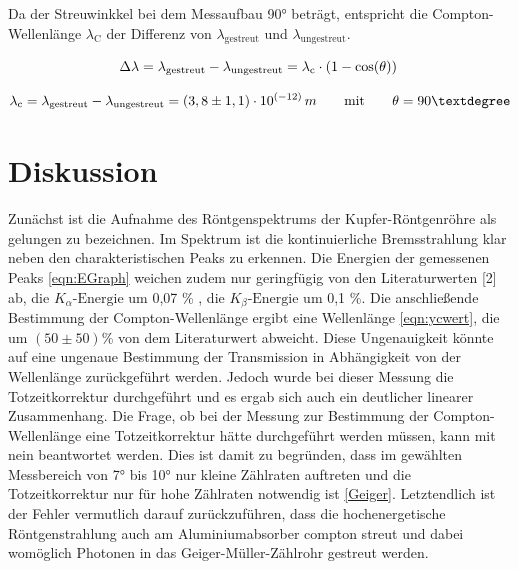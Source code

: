 \documentclass[titlepage = firstcover]{scrartcl}
\begin{document}
        \noindent
        Da der Streuwinkkel bei dem Messaufbau 90° beträgt, entspricht die Compton-Wellenlänge $\lambda_{\text{C}}$ der Differenz von $\lambda_{\text{gestreut}}$
        und $\lambda_{\text{ungestreut}}$.
        
        \begin{equation*}
            \Delta \lambda = \lambda_{\text{gestreut}} - \lambda_{\text{ungestreut}} = \lambda_{\text{c}} \cdot \left(1 -\cos (\theta)\right) \\
            \label{eqn:ycexp}
        \end{equation*}

        \begin{equation}
            \lambda_{\text{c}} = \lambda_{\text{gestreut}} - \lambda_{\text{ungestreut}} = (3,8 \pm 1,1) \cdot 10^{\left(-12\right)} \, m \qquad \text{mit} \qquad \theta=90° \\
            \label{eqn:ycwert}
        \end{equation} 



    \section{Diskussion}
        Zunächst ist die Aufnahme des Röntgenspektrums der Kupfer-Röntgenröhre als gelungen zu bezeichnen. Im Spektrum ist die kontinuierliche Bremsstrahlung 
        klar neben den charakteristischen Peaks zu erkennen. Die Energien der gemessenen Peaks \ref{eqn:EGraph} weichen zudem nur geringfügig von den Literaturwerten [2] ab, 
        die $K_{\alpha}\text{-Energie}$ um 0,07 \% , die $K_{\beta}\text{-Energie}$ um 0,1 \%. Die anschließende Bestimmung der Compton-Wellenlänge ergibt
        eine Wellenlänge \ref{eqn:ycwert}, die um $(50 \pm 50)$\% von dem Literaturwert  abweicht. Diese Ungenauigkeit könnte auf eine
        ungenaue Bestimmung der Transmission in Abhängigkeit von der Wellenlänge zurückgeführt werden. Jedoch wurde bei dieser Messung die Totzeitkorrektur
        durchgeführt und es ergab sich auch ein deutlicher linearer Zusammenhang. Die Frage, ob bei der Messung zur Bestimmung der Compton-Wellenlänge eine
        Totzeitkorrektur hätte durchgeführt werden müssen, kann mit nein beantwortet werden. Dies ist damit zu begründen, dass im gewählten Messbereich von 
        7° bis 10° nur kleine Zählraten auftreten und die Totzeitkorrektur nur für hohe Zählraten notwendig ist \ref{Geiger}. Letztendlich ist der Fehler 
        vermutlich darauf zurückzuführen, dass die hochenergetische Röntgenstrahlung auch am Aluminiumabsorber compton streut und dabei womöglich Photonen
        in das Geiger-Müller-Zählrohr gestreut werden.
\end{document}
